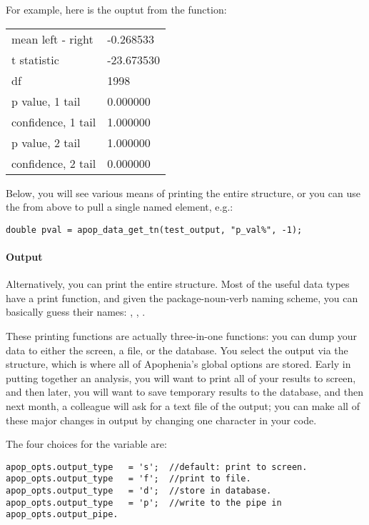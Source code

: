 For example, here is the 
 ouptut from the 
function:

\begin{center}
\begin{tabular}{|ll|}
\hline
mean left - right     &-0.268533\\
t statistic           &-23.673530\\
df                    & 1998\\
p value, 1 tail       & 0.000000\\
confidence, 1 tail    & 1.000000\\
p value, 2 tail       & 1.000000\\
confidence, 2 tail    & 0.000000\\
\hline
\end{tabular}
\end{center}
\hspace\baselineskip

Below, you will see various means
of printing the entire  structure, or you can use
the 
 from above to pull a single named element, e.g.:
\begin{lstlisting}
double pval = apop_data_get_tn(test_output, "p_val%", -1);
\end{lstlisting}

\paragraph{Output} 
Alternatively, you can print the entire   structure.
Most of the useful data types have
a print function, and given the package-noun-verb naming scheme,
you can basically guess their names: ,
, . 

These printing functions are actually three-in-one functions: you can
dump your data to either the screen, a file, or the database. You select
the output via the  structure, which is where all of
Apophenia's global options are stored. Early in putting together an
analysis, you will want to print all of your results to screen, and then
later, you will want to save temporary results to the database, and then
next month, a colleague will ask for a text file of the output; you can
make all of these major changes in output by changing 
one character in your code.

The four choices for the  
variable are:
\begin{lstlisting}
apop_opts.output_type   = 's';  //default: print to screen.
apop_opts.output_type   = 'f';  //print to file.
apop_opts.output_type   = 'd';  //store in database.
apop_opts.output_type   = 'p';  //write to the pipe in apop_opts.output_pipe.
\end{lstlisting}

